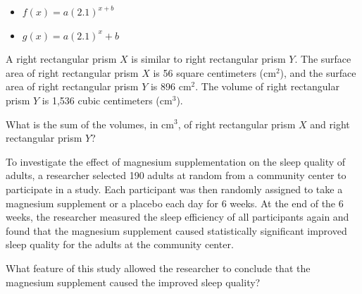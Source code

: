 \begin{itemize}
\item[I] \(f(x) = a(2.1)^{x + b}\)
\item[II] \(g(x) = a(2.1)^x + b\)
\end{itemize}

\vspace{0.75em}


\vspace{2em}
\newpage

\noindent\markforreview
\vspace{1em}

A right rectangular prism \(X\) is similar to right rectangular prism \(Y\). The surface area of right rectangular prism \(X\) is 56 square centimeters (\(\text{cm}^2\)), and the surface area of right rectangular prism \(Y\) is 896 \(\text{cm}^2\). The volume of right rectangular prism \(Y\) is 1,536 cubic centimeters (\(\text{cm}^3\)).

What is the sum of the volumes, in \(\text{cm}^3\), of right rectangular prism \(X\) and right rectangular prism \(Y\)?

\vspace{2em}
\newpage

\noindent\markforreview
\vspace{1em}

To investigate the effect of magnesium supplementation on the sleep quality of adults, a researcher selected 190 adults at random from a community center to participate in a study. Each participant was then randomly assigned to take a magnesium supplement or a placebo each day for 6 weeks. At the end of the 6 weeks, the researcher measured the sleep efficiency of all participants again and found that the magnesium supplement caused statistically significant improved sleep quality for the adults at the community center.

What feature of this study allowed the researcher to conclude that the magnesium supplement caused the improved sleep quality?

\vspace{0.75em}


